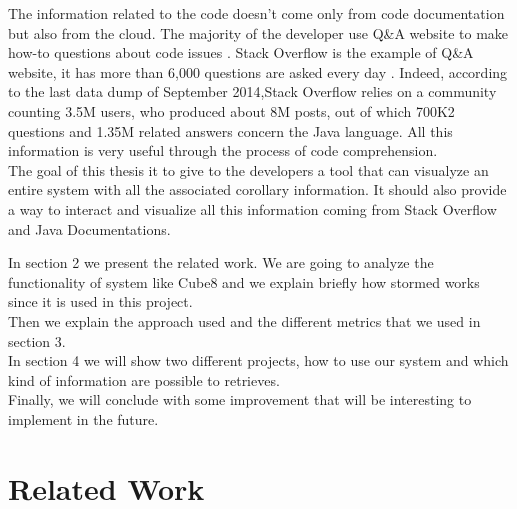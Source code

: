 \documentclass[]{usiinfbachelorproject}
\begin{document}
The information related to the code doesn't come only from code documentation but also from the cloud.
The majority of the developer use Q\&A website to make  how-to questions about code issues \cite{Treude}. Stack Overflow is the example of Q\&A website, it has more than 6,000 questions are asked every day \cite{QEA}. Indeed, according to the last data dump of September 2014,Stack Overflow relies on a community counting 3.5M users, who produced about 8M posts, out of which 700K2 questions and 1.35M related answers concern the Java language. All this information is very useful through the process of code comprehension.\\
The goal of this thesis it to give to the developers a tool that can visualyze an entire system with all the associated corollary information. It should also provide a way to interact and visualize all this information coming from Stack Overflow and Java Documentations.




In section 2 we present the related work. We are going to analyze the functionality of system like Cube8 and we explain briefly how stormed works since it is used in this project.\\ Then we explain the approach used and the different metrics that we used in section 3.\\ In section 4 we will show two different projects, how to use our system and which kind of information are possible to retrieves.\\ Finally, we will conclude with some improvement that will be interesting to implement in the future.


\newpage


  
\section{Related Work} \label{related works}
\end{document}
